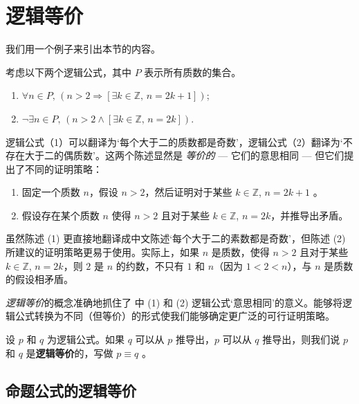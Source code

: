 \section{逻辑等价}

我们用一个例子来引出本节的内容。

\begin{example}
\label{exNoEvenPrimeGreaterThanTwo}
考虑以下两个逻辑公式，其中 $P$ 表示所有质数的集合。
\begin{enumerate}[(1)]
\item $\forall n \in P,\, (n > 2 \Rightarrow [\exists k \in \mathbb{Z},\, n=2k+1])$;
\item $\neg \exists n \in P,\, (n > 2 \wedge [\exists k \in \mathbb{Z},\, n=2k])$.
\end{enumerate}
逻辑公式（1）可以翻译为`每个大于二的质数都是奇数'，逻辑公式（2）翻译为`不存在大于二的偶质数'。这两个陈述显然是 \textit{等价的} --- 它们的意思相同 --- 但它们提出了不同的证明策略：

\begin{enumerate}[(1)]
\item 固定一个质数 $n$，假设 $n>2$，然后证明对于某些 $k \in \mathbb{Z}$, $n = 2k+1$ 。
\item 假设存在某个质数 $n$ 使得 $n>2$ 且对于某些 $k \in \mathbb{Z}$, $n=2k$，并推导出矛盾。
\end{enumerate}

虽然陈述 (1) 更直接地翻译成中文陈述`每个大于二的素数都是奇数'，但陈述 (2) 所建议的证明策略更易于使用。实际上，如果 $n$ 是质数，使得 $n>2$ 且对于某些 $k \in \mathbb{Z}$, $n=2k$，则 $2$ 是 $n$ 的约数，不只有 $1$ 和 $n$（因为 $1<2<n$），与 $n$ 是质数的假设相矛盾。
\end{example}

\textit{逻辑等价}的概念准确地抓住了  中 (1) 和 (2) 逻辑公式`意思相同'的意义。能够将逻辑公式转换为不同（但等价）的形式使我们能够确定更广泛的可行证明策略。

\begin{definition}
\label{defLogicalEquivalence}
设 $p$ 和 $q$ 为逻辑公式。如果 $q$ 可以从 $p$ 推导出，$p$ 可以从 $q$ 推导出，则我们说 $p$ 和 $q$ 是\textbf{逻辑等价}的，写做 $p \equiv q$ 。
\end{definition}

\subsection*{命题公式的逻辑等价}

